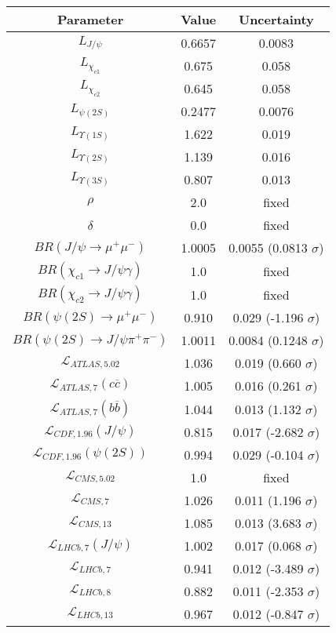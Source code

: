 \begin{table}[h!]
\centering
\begin{tabular}{c|c|c}
Parameter & Value & Uncertainty \\
\hline
$L_{J/\psi}$ & 0.6657 & 0.0083 \\
$L_{\chi_{c1}}$ & 0.675 & 0.058 \\
$L_{\chi_{c2}}$ & 0.645 & 0.058 \\
$L_{\psi(2S)}$ & 0.2477 & 0.0076 \\
$L_{\Upsilon(1S)}$ & 1.622 & 0.019 \\
$L_{\Upsilon(2S)}$ & 1.139 & 0.016 \\
$L_{\Upsilon(3S)}$ & 0.807 & 0.013 \\
$\rho$ & 2.0 & fixed \\
$\delta$ & 0.0 & fixed \\
$BR(J/\psi\rightarrow\mu^+\mu^-)$ & 1.0005 & 0.0055 (0.0813 $\sigma$) \\
$BR(\chi_{c1}\rightarrow J/\psi\gamma)$ & 1.0 & fixed \\
$BR(\chi_{c2}\rightarrow J/\psi\gamma)$ & 1.0 & fixed \\
$BR(\psi(2S)\rightarrow\mu^+\mu^-)$ & 0.910 & 0.029 (-1.196 $\sigma$) \\
$BR(\psi(2S)\rightarrow J/\psi\pi^+\pi^-)$ & 1.0011 & 0.0084 (0.1248 $\sigma$) \\
$\mathcal L_{ATLAS,5.02}$ & 1.036 & 0.019 (0.660 $\sigma$) \\
$\mathcal L_{ATLAS,7}(c\overline c)$ & 1.005 & 0.016 (0.261 $\sigma$) \\
$\mathcal L_{ATLAS,7}(b\overline b)$ & 1.044 & 0.013 (1.132 $\sigma$) \\
$\mathcal L_{CDF,1.96}(J/\psi)$ & 0.815 & 0.017 (-2.682 $\sigma$) \\
$\mathcal L_{CDF,1.96}(\psi(2S))$ & 0.994 & 0.029 (-0.104 $\sigma$) \\
$\mathcal L_{CMS,5.02}$ & 1.0 & fixed \\
$\mathcal L_{CMS,7}$ & 1.026 & 0.011 (1.196 $\sigma$) \\
$\mathcal L_{CMS,13}$ & 1.085 & 0.013 (3.683 $\sigma$) \\
$\mathcal L_{LHCb,7}(J/\psi)$ & 1.002 & 0.017 (0.068 $\sigma$) \\
$\mathcal L_{LHCb,7}$ & 0.941 & 0.012 (-3.489 $\sigma$) \\
$\mathcal L_{LHCb,8}$ & 0.882 & 0.011 (-2.353 $\sigma$) \\
$\mathcal L_{LHCb,13}$ & 0.967 & 0.012 (-0.847 $\sigma$) \\

\end{tabular}
\end{table}
